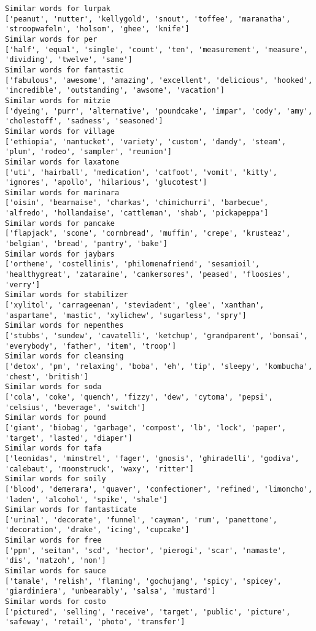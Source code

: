 \documentclass[11pt]{article}
\begin{document}
\begin{Verbatim}[commandchars=\\\{\}]
Similar words for lurpak
['peanut', 'nutter', 'kellygold', 'snout', 'toffee', 'maranatha', 'stroopwafeln', 'holsom', 'ghee', 'knife']
Similar words for per
['half', 'equal', 'single', 'count', 'ten', 'measurement', 'measure', 'dividing', 'twelve', 'same']
Similar words for fantastic
['fabulous', 'awesome', 'amazing', 'excellent', 'delicious', 'hooked', 'incredible', 'outstanding', 'awsome', 'vacation']
Similar words for mitzie
['dyeing', 'purr', 'alternative', 'poundcake', 'impar', 'cody', 'amy', 'cholestoff', 'sadness', 'seasoned']
Similar words for village
['ethiopia', 'nantucket', 'variety', 'custom', 'dandy', 'steam', 'plum', 'rodeo', 'sampler', 'reunion']
Similar words for laxatone
['uti', 'hairball', 'medication', 'catfoot', 'vomit', 'kitty', 'ignores', 'apollo', 'hilarious', 'glucotest']
Similar words for marinara
['oisin', 'bearnaise', 'charkas', 'chimichurri', 'barbecue', 'alfredo', 'hollandaise', 'cattleman', 'shab', 'pickapeppa']
Similar words for pancake
['flapjack', 'scone', 'cornbread', 'muffin', 'crepe', 'krusteaz', 'belgian', 'bread', 'pantry', 'bake']
Similar words for jaybars
['orthene', 'costellinis', 'philomenafriend', 'sesamioil', 'healthygreat', 'zataraine', 'cankersores', 'peased', 'floosies', 'verry']
Similar words for stabilizer
['xylitol', 'carrageenan', 'steviadent', 'glee', 'xanthan', 'aspartame', 'mastic', 'xylichew', 'sugarless', 'spry']
Similar words for nepenthes
['stubbs', 'sundew', 'cavatelli', 'ketchup', 'grandparent', 'bonsai', 'everybody', 'father', 'item', 'troop']
Similar words for cleansing
['detox', 'pm', 'relaxing', 'boba', 'eh', 'tip', 'sleepy', 'kombucha', 'chest', 'british']
Similar words for soda
['cola', 'coke', 'quench', 'fizzy', 'dew', 'cytoma', 'pepsi', 'celsius', 'beverage', 'switch']
Similar words for pound
['giant', 'biobag', 'garbage', 'compost', 'lb', 'lock', 'paper', 'target', 'lasted', 'diaper']
Similar words for tafa
['leonidas', 'minstrel', 'fager', 'gnosis', 'ghiradelli', 'godiva', 'calebaut', 'moonstruck', 'waxy', 'ritter']
Similar words for soily
['blood', 'demerara', 'quaver', 'confectioner', 'refined', 'limoncho', 'laden', 'alcohol', 'spike', 'shale']
Similar words for fantasticate
['urinal', 'decorate', 'funnel', 'cayman', 'rum', 'panettone', 'decoration', 'drake', 'icing', 'cupcake']
Similar words for free
['ppm', 'seitan', 'scd', 'hector', 'pierogi', 'scar', 'namaste', 'dis', 'matzoh', 'non']
Similar words for sauce
['tamale', 'relish', 'flaming', 'gochujang', 'spicy', 'spicey', 'giardiniera', 'unbearably', 'salsa', 'mustard']
Similar words for costo
['pictured', 'selling', 'receive', 'target', 'public', 'picture', 'safeway', 'retail', 'photo', 'transfer']

\end{Verbatim}
\end{document}
